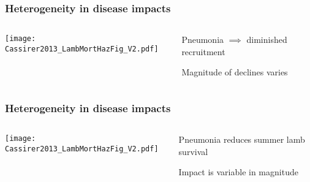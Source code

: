 \documentclass[fleqn,xcolor=table]{beamer}
\begin{document}
\begin{frame}
	\frametitle{\color{darkred} Heterogeneity in disease impacts}
	\begin{columns}[t]
		\vspace{.05in}

	\texttt{[image: Cassirer2013\_LambMortHazFig\_V2.pdf]}
	\newline
	{\footnotesize \color{white}{Hypothesis: Variation explained by
	incomplete exposure}}
			\begin{minipage}[t][.8\textheight][t]{\linewidth}
				\vspace{.4in}
%
			\begin{itemize}
				{\footnotesize
				\item[] {\color{white} \scriptsize Pneumonia $\implies$ diminished recruitment}
				\item[] {\color{white} \scriptsize Magnitude of declines varies} 
				}
			\end{itemize}
		\end{minipage}
	\end{columns}
		
\end{frame}

\begin{frame}
	\frametitle{\color{darkred} Heterogeneity in disease impacts}
	\begin{columns}[t]
		\column{.65\textwidth}
		\vspace{.05in}

	\texttt{[image: Cassirer2013\_LambMortHazFig\_V2.pdf]}
	\newline
	{\footnotesize \color{white}{Hypothesis: Variation explained by
	incomplete exposure}}
		\column{.35\textwidth}
			\begin{minipage}[t][.8\textheight][t]{\linewidth}
				\vspace{.4in}

			\begin{itemize}
				{\footnotesize
				\item {\color{navy} \scriptsize Pneumonia
					reduces summer lamb survival}
					\vspace{.1in}
				\item {\color{navy} \scriptsize Impact is
					variable in magnitude} 
				}
			\end{itemize}
		\end{minipage}
	\end{columns}
		
\end{frame}
\end{document}

